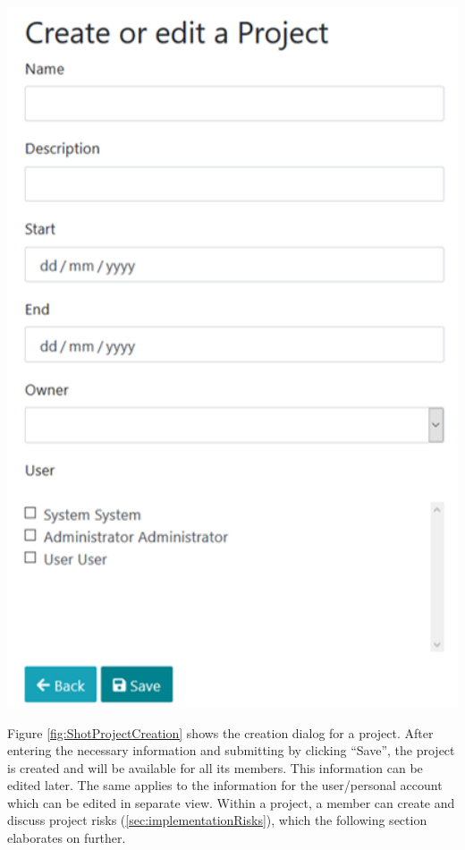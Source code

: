 \begin{minipage}{.4\linewidth}
	\includegraphics[width=2.3\textwidth]{Assets/implementation_shots/CreateProject.png}
	\label{fig:ShotProjectCreation}
\end{minipage}
\hfill
\begin{minipage}{.6\linewidth}
Figure \ref{fig:ShotProjectCreation} shows the creation dialog for a project. After entering the necessary information and submitting by clicking “Save”, the project is created and will be available for all its members. This information can be edited later. The same applies to the information for the user/personal account which can be edited in separate view. Within a project, a member can create and discuss project risks (\ref{sec:implementationRisks}), which the following section elaborates on further.
\end{minipage}